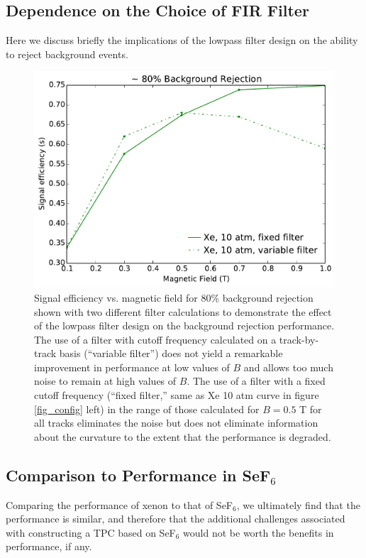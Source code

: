 \documentclass{JINST}
\begin{document}
\subsection{Dependence on the Choice of FIR Filter}\label{ssec:FIRdep}
Here we discuss briefly the implications of the lowpass filter design on the ability to reject background events.

\begin{figure}[!htb]
	\centering
	\includegraphics[scale=0.43]{fig/eff_vs_b_cf_filter_80.pdf}
	\caption{\label{fig_FIRdependence}Signal efficiency vs. magnetic field for 80\% background rejection shown with two different filter calculations to demonstrate the effect of the lowpass filter design on the background rejection performance.  The use of a filter with cutoff frequency calculated on a track-by-track basis (``variable filter'') does not yield a remarkable improvement in performance at low values of $B$ and allows too much noise to remain at high values of $B$.  The use of a filter with a fixed cutoff frequency (``fixed filter,'' same as Xe 10 atm curve in figure \protect\ref{fig_config} left) in the range of those calculated for $B = 0.5$ T for all tracks eliminates the noise but does not eliminate information about the curvature to the extent that the performance is degraded.}
\end{figure}

\subsection{Comparison to Performance in SeF$_6$}
Comparing the performance of xenon to that of SeF$_6$, we ultimately find that the performance is similar, and
therefore that the additional challenges associated with constructing a TPC based on SeF$_6$ would not be worth
the benefits in performance, if any.
\end{document}
